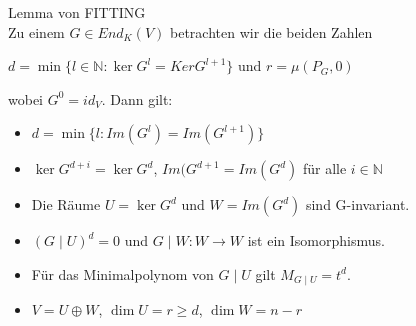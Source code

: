 \begin{satz}
Lemma von FITTING \\
Zu einem $G \in End_K(V)$ betrachten wir die beiden Zahlen
\begin{center}
$d = \min \{l \in \mathbb{N}: \ker G^l = Ker G^{l+1} \}$ und $r=\mu(P_G, 0)$
\end{center}
wobei $G^0 = id_V$. Dann gilt:
\begin{itemize}
\item $d=\min \{l: Im(G^l) = Im(G^{l+1})\}$
\item $\ker G^{d+i}=\ker G^d$, $Im(G^{d+1} = Im(G^d)$ für alle $i \in \mathbb{N}$
\item Die Räume $U=\ker G^d$ und $W=Im(G^d)$ sind G-invariant.
\item $(G \mid U)^d=0$ und $G \mid W : W \to W$ ist ein Isomorphismus.
\item Für das Minimalpolynom von $G \mid U$ gilt $M_{G \mid U} = t^d$.
\item $V=U\oplus W$, $\dim U = r \geq d$, $\dim W = n-r$
\end{itemize}
\end{satz}
